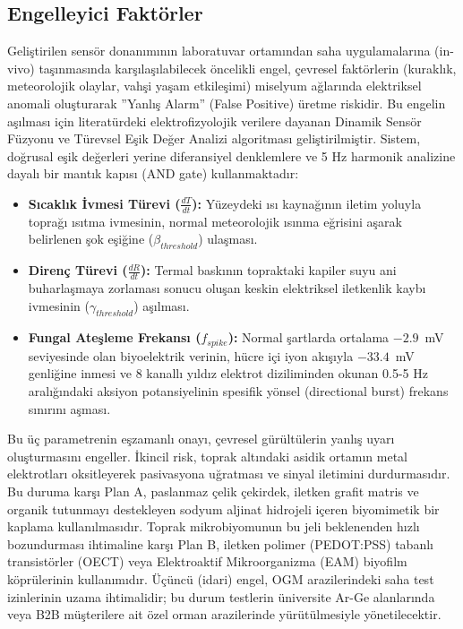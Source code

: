 \documentclass[11pt,a4paper]{article}
\begin{document}
\subsection{Engelleyici Faktörler}

Geliştirilen sensör donanımının laboratuvar ortamından saha uygulamalarına (in-vivo) taşınmasında karşılaşılabilecek öncelikli engel, çevresel faktörlerin (kuraklık, meteorolojik olaylar, vahşi yaşam etkileşimi) miselyum ağlarında elektriksel anomali oluşturarak ''Yanlış Alarm'' (False Positive) üretme riskidir. Bu engelin aşılması için literatürdeki elektrofizyolojik verilere dayanan Dinamik Sensör Füzyonu ve Türevsel Eşik Değer Analizi algoritması geliştirilmiştir. Sistem, doğrusal eşik değerleri yerine diferansiyel denklemlere ve 5 Hz harmonik analizine dayalı bir mantık kapısı (AND gate) kullanmaktadır:

\begin{itemize}[leftmargin=1.2cm]
  \item \textbf{Sıcaklık İvmesi Türevi ($\frac{dT}{dt}$):} Yüzeydeki ısı kaynağının iletim yoluyla toprağı ısıtma ivmesinin, normal meteorolojik ısınma eğrisini aşarak belirlenen şok eşiğine ($\beta_{threshold}$) ulaşması.
  \item \textbf{Direnç Türevi ($\frac{dR}{dt}$):} Termal baskının topraktaki kapiler suyu ani buharlaşmaya zorlaması sonucu oluşan keskin elektriksel iletkenlik kaybı ivmesinin ($\gamma_{threshold}$) aşılması.
  \item \textbf{Fungal Ateşleme Frekansı ($f_{spike}$):} Normal şartlarda ortalama $-2.9$~mV seviyesinde olan biyoelektrik verinin, hücre içi iyon akışıyla $-33.4$~mV genliğine inmesi ve 8 kanallı yıldız elektrot diziliminden okunan 0.5-5 Hz aralığındaki aksiyon potansiyelinin spesifik yönsel (directional burst) frekans sınırını aşması.
\end{itemize}

Bu üç parametrenin eşzamanlı onayı, çevresel gürültülerin yanlış uyarı oluşturmasını engeller. İkincil risk, toprak altındaki asidik ortamın metal elektrotları oksitleyerek pasivasyona uğratması ve sinyal iletimini durdurmasıdır. Bu duruma karşı Plan A, paslanmaz çelik çekirdek, iletken grafit matris ve organik tutunmayı destekleyen sodyum aljinat hidrojeli içeren biyomimetik bir kaplama kullanılmasıdır. Toprak mikrobiyomunun bu jeli beklenenden hızlı bozundurması ihtimaline karşı Plan B, iletken polimer (PEDOT:PSS) tabanlı transistörler (OECT) veya Elektroaktif Mikroorganizma (EAM) biyofilm köprülerinin kullanımıdır. Üçüncü (idari) engel, OGM arazilerindeki saha test izinlerinin uzama ihtimalidir; bu durum testlerin üniversite Ar-Ge alanlarında veya B2B müşterilere ait özel orman arazilerinde yürütülmesiyle yönetilecektir.
\end{document}
